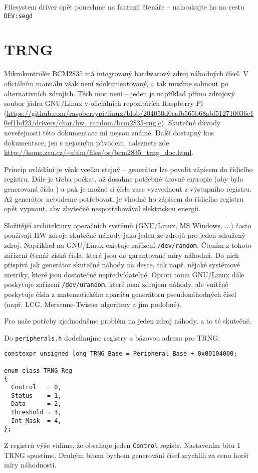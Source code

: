 \documentclass{article}
\begin{document}
Filesystem driver opět ponechme na fantazii čtenáře -- nahookujte ho na cestu \texttt{DEV:segd}

\section{TRNG}

Mikrokontrolér BCM2835 má integrovaný hardwarový zdroj náhodných čísel. V oficiálním manuálu však není zdokumentovaný, a tak musíme sahnout po alternativních zdrojích. Těch moc není -- jeden je například přímo zdrojový soubor jádra GNU/Linux v oficiálních repozitářích Raspberry Pi (\url{https://github.com/raspberrypi/linux/blob/204050d0eafb565b68abf512710036c10ef1bd23/drivers/char/hw_random/bcm2835-rng.c}). Skutečné důvody neveřejnosti této dokumentace mi nejsou známé. Další dostupný kus dokumentace, jen s nejasným původem, naleznete zde \url{http://home.zcu.cz/~ublm/files/os/bcm2835_trng_doc.html}.

Princip ovládání je však vcelku stejný -- generátor lze povolit zápisem do řídicího registru. Dále je třeba počkat, až dosahne potřebné úrovně entropie (aby byla generovaná čísla ) a pak je možné si čísla zase vyzvednout z výstupního registru. Až generátor nebudeme potřebovat, je vhodné ho zápisem do řídicího registru opět vypnout, aby zbytečně nespotřebovával elektrickou energii.

Složitější architektury operačních systémů (GNU/Linux, MS Windows, ...) často používají HW zdroje skutečné náhody jako jeden ze zdrojů pro jeden sdružený zdroj. Například na GNU/Linux existuje zařízení \texttt{/dev/random}. Čtením z tohoto zařízení čtenář získá čísla, která jsou do garantované míry náhodná. Do nich přispívá jak generátor skutečné náhody na desce, tak např. nějaké systémové metriky, které jsou dostatečně nepředvídatelné. Oproti tomu GNU/Linux dále poskytuje zařízení \texttt{/dev/urandom}, které není zdrojem  náhody, ale vnitřně poskytuje čísla z matematického aparátu generátoru pseudonáhodných čísel (např. LCG, Mersenne-Twister algoritmy a jím podobné).

Pro naše potřeby zjednodušme problém na jeden zdroj náhody, a to té skutečné.

Do \texttt{peripherals.h} dodefinujme registry a bázovou adresu pro TRNG:
\begin{lstlisting}
constexpr unsigned long TRNG_Base = Peripheral_Base + 0x00104000;

enum class TRNG_Reg
{
  Control   = 0,
  Status    = 1,
  Data      = 2,
  Threshold = 3,
  Int_Mask  = 4,
};
\end{lstlisting}
Z registrů výše vidíme, že obsahuje jeden \texttt{Control} registr. Nastavením bitu 1 TRNG spustíme. Druhým bitem bychom generování čísel zrychlili za cenu horší míry náhodnosti.
\end{document}
